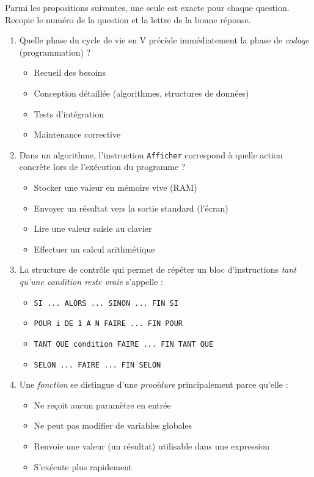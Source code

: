 \documentclass[11pt]{article}
\begin{document}
\begin{exercice}
Parmi les propositions suivantes, une seule est exacte pour chaque question. Recopie le numéro de la question et la lettre de la bonne réponse.

\begin{enumerate}
    \item Quelle phase du cycle de vie en V précède immédiatement la phase de \emph{codage} (programmation) ?
    \begin{itemize}
        \item[A.] Recueil des besoins
        \item[B.] Conception détaillée (algorithmes, structures de données)
        \item[C.] Tests d'intégration
        \item[D.] Maintenance corrective
    \end{itemize}

    \item Dans un algorithme, l'instruction \texttt{Afficher} correspond à quelle action concrète lors de l'exécution du programme ?
    \begin{itemize}
        \item[A.] Stocker une valeur en mémoire vive (RAM)
        \item[B.] Envoyer un résultat vers la sortie standard (l'écran)
        \item[C.] Lire une valeur saisie au clavier
        \item[D.] Effectuer un calcul arithmétique
    \end{itemize}

    \item La structure de contrôle qui permet de répéter un bloc d'instructions \emph{tant qu'une condition reste vraie} s'appelle :
    \begin{itemize}
        \item[A.] \texttt{SI ... ALORS ... SINON ... FIN SI}
        \item[B.] \texttt{POUR i DE 1 A N FAIRE ... FIN POUR}
        \item[C.] \texttt{TANT QUE condition FAIRE ... FIN TANT QUE}
        \item[D.] \texttt{SELON ... FAIRE ... FIN SELON}
    \end{itemize}

    \item Une \emph{fonction} se distingue d'une \emph{procédure} principalement parce qu'elle :
    \begin{itemize}
        \item[A.] Ne reçoit aucun paramètre en entrée
        \item[B.] Ne peut pas modifier de variables globales
        \item[C.] Renvoie une valeur (un résultat) utilisable dans une expression
        \item[D.] S'exécute plus rapidement
    \end{itemize}
\end{enumerate}
\end{exercice}
\end{document}
